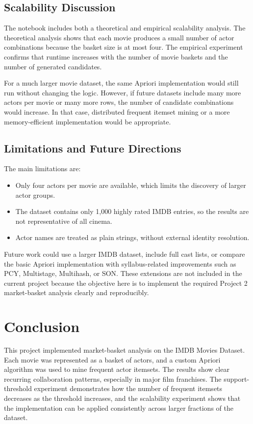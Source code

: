 \documentclass[11pt,a4paper]{article}
\begin{document}
\subsection{Scalability Discussion}
The notebook includes both a theoretical and empirical scalability analysis. The theoretical analysis shows that each movie produces a small number of actor combinations because the basket size is at most four. The empirical experiment confirms that runtime increases with the number of movie baskets and the number of generated candidates.

For a much larger movie dataset, the same Apriori implementation would still run without changing the logic. However, if future datasets include many more actors per movie or many more rows, the number of candidate combinations would increase. In that case, distributed frequent itemset mining or a more memory-efficient implementation would be appropriate.

\subsection{Limitations and Future Directions}
The main limitations are:
\begin{itemize}[leftmargin=*]
    \item Only four actors per movie are available, which limits the discovery of larger actor groups.
    \item The dataset contains only 1,000 highly rated IMDB entries, so the results are not representative of all cinema.
    \item Actor names are treated as plain strings, without external identity resolution.
\end{itemize}

Future work could use a larger IMDB dataset, include full cast lists, or compare the basic Apriori implementation with syllabus-related improvements such as PCY, Multistage, Multihash, or SON. These extensions are not included in the current project because the objective here is to implement the required Project 2 market-basket analysis clearly and reproducibly.

\section{Conclusion}
This project implemented market-basket analysis on the IMDB Movies Dataset. Each movie was represented as a basket of actors, and a custom Apriori algorithm was used to mine frequent actor itemsets. The results show clear recurring collaboration patterns, especially in major film franchises. The support-threshold experiment demonstrates how the number of frequent itemsets decreases as the threshold increases, and the scalability experiment shows that the implementation can be applied consistently across larger fractions of the dataset.
\end{document}
